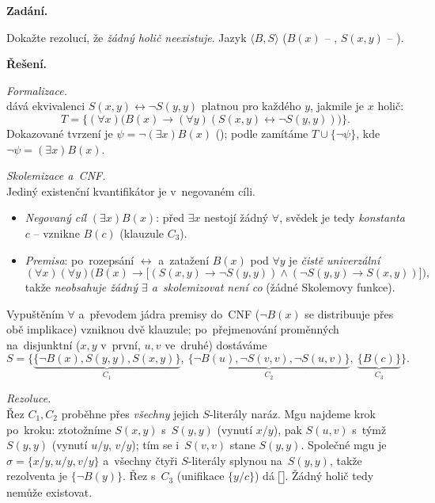 \documentclass[11pt,a4paper]{article}
\newcommand{\eclause}{\mathord{\text{\framebox[1.25ex][c]{\rule{0pt}{0.95ex}}}}}
\begin{document}
\begin{priklad}
\textbf{Zadání.}\par
{} Dokažte rezolucí, že \emph{žádný holič neexistuje}. Jazyk $\langle B,S\rangle$ ($B(x)$ -- , $S(x,y)$ -- ).

\smallskip
\textbf{Řešení.}

\emph{Formalizace.}\\
 dává ekvivalenci $S(x,y)\leftrightarrow\neg S(y,y)$ platnou pro každého $y$, jakmile je $x$ holič:
\[
T=\big\{(\forall x)\big(B(x)\to(\forall y)(S(x,y)\leftrightarrow\neg S(y,y))\big)\big\}.
\]
Dokazované tvrzení je $\psi=\neg(\exists x)B(x)$ (); podle  zamítáme $T\cup\{\neg\psi\}$, kde $\neg\psi=(\exists x)B(x)$.

\smallskip
\emph{Skolemizace a~CNF.}\\
Jediný existenční kvantifikátor je v~negovaném cíli.
\begin{itemize}
  \item \emph{Negovaný cíl} $(\exists x)B(x)$: před $\exists x$ nestojí žádný $\forall$, svědek je tedy \emph{konstanta} $c$ -- vznikne $B(c)$ (klauzule $C_3$).
  \item \emph{Premisa}: po~rozepsání $\leftrightarrow$ a~zatažení $B(x)$ pod $\forall y$ je \emph{čistě univerzální}
    \[
    (\forall x)(\forall y)\Big(B(x)\to\big[(S(x,y)\to\neg S(y,y))\wedge(\neg S(y,y)\to S(x,y))\big]\Big),
    \]
    takže \emph{neobsahuje žádný $\exists$ a~skolemizovat není co} (žádné Skolemovy funkce).
\end{itemize}
Vypuštěním $\forall$ a~převodem jádra premisy do~CNF ($\neg B(x)$ se distribuuje přes obě implikace) vzniknou dvě klauzule; po~přejmenování proměnných na~disjunktní ($x,y$ v~první, $u,v$ ve~druhé) dostáváme
\[
S=\big\{\underbrace{\{\neg B(x),S(y,y),S(x,y)\}}_{C_1},\ \underbrace{\{\neg B(u),\neg S(v,v),\neg S(u,v)\}}_{C_2},\ \underbrace{\{B(c)\}}_{C_3}\big\}.
\]

\emph{Rezoluce.}\\
Řez $C_1,C_2$ proběhne přes \emph{všechny} jejich $S$-literály naráz. Mgu najdeme krok po~kroku: ztotožníme $S(x,y)$ s~$S(y,y)$ (vynutí $x/y$), pak $S(u,v)$ s~týmž $S(y,y)$ (vynutí $u/y$, $v/y$); tím se i~$S(v,v)$ stane $S(y,y)$. Společné mgu je $\sigma=\{x/y,u/y,v/y\}$ a~všechny čtyři $S$-literály splynou na~$S(y,y)$, takže rezolventa je $\{\neg B(y)\}$. Řez s~$C_3$ (unifikace $\{y/c\}$) dá $\eclause$. Žádný holič tedy nemůže existovat.


\end{priklad}
\end{document}
